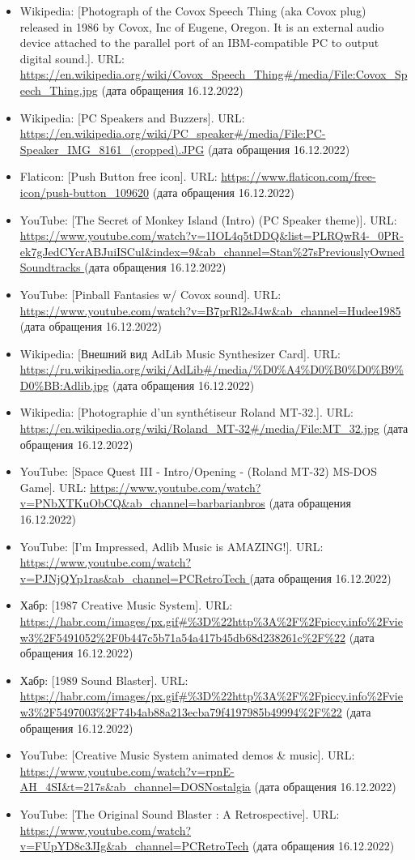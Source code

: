 \documentclass[a4paper,12pt]{extarticle}
\begin{document}
\begin{enumerate}[label=\textbf{\arabic*}]
\begin{itemize}
			\item Wikipedia: [Photograph of the Covox Speech Thing (aka Covox plug) released in 1986 by Covox, Inc of Eugene, Oregon. It is an external audio device attached to the parallel port of an IBM-compatible PC to output digital sound.]. URL: \url{https://en.wikipedia.org/wiki/Covox_Speech_Thing#/media/File:Covox_Speech_Thing.jpg} (дата обращения 16.12.2022)
			\item Wikipedia: [PC Speakers and Buzzers]. URL: \url{https://en.wikipedia.org/wiki/PC_speaker#/media/File:PC-Speaker_IMG_8161_(cropped).JPG} (дата обращения 16.12.2022)
			\item Flaticon: [Push Button free icon]. URL: \url{https://www.flaticon.com/free-icon/push-button_109620} (дата обращения 16.12.2022)
			\item YouTube: [The Secret of Monkey Island (Intro) (PC Speaker theme)]. URL: \url{https://www.youtube.com/watch?v=1IOL4q5tDDQ&list=PLRQwR4-_0PR-ek7gJedCYcrABJuiISCul&index=9&ab_channel=Stan%
			} (дата обращения 16.12.2022)
			\item YouTube: [Pinball Fantasies w/ Covox sound]. URL: \url{https://www.youtube.com/watch?v=B7prRl2sJ4w&ab_channel=Hudee1985
			} (дата обращения 16.12.2022)
			
			\item Wikipedia: [Внешний вид AdLib Music Synthesizer Card]. URL: \url{https://ru.wikipedia.org/wiki/AdLib#/media/%D0%A4%D0%B0%D0%B9%D0%BB:Adlib.jpg} (дата обращения 16.12.2022)
			\item Wikipedia: [Photographie d'un synthétiseur Roland MT-32.]. URL: \url{https://en.wikipedia.org/wiki/Roland_MT-32#/media/File:MT_32.jpg} (дата обращения 16.12.2022)
			\item YouTube: [Space Quest III - Intro/Opening - (Roland MT-32) MS-DOS Game]. URL: \url{https://www.youtube.com/watch?v=PNbXTKuObCQ&ab_channel=barbarianbros} (дата обращения 16.12.2022)
			\item YouTube: [I'm Impressed, Adlib Music is AMAZING!]. URL: \url{https://www.youtube.com/watch?v=PJNjQYp1ras&ab_channel=PCRetroTech
			} (дата обращения 16.12.2022)
			
			\item Хабр: [1987 Creative Music System]. URL: \url{https://habr.com/images/px.gif#%3D%22http%3A%2F%2Fpiccy.info%2Fview3%2F5491052%2F0b447c5b71a54a417b45db68d238261c%2F%22} (дата обращения 16.12.2022)
			\item Хабр: [1989 Sound Blaster]. URL: \url{https://habr.com/images/px.gif#%3D%22http%3A%2F%2Fpiccy.info%2Fview3%2F5497003%2F74b4ab88a213ecba79f4197985b49994%2F%22} (дата обращения 16.12.2022)
			\item YouTube: [Creative Music System animated demos \& music]. URL: \url{https://www.youtube.com/watch?v=rpnE-AH_4SI&t=217s&ab_channel=DOSNostalgia} (дата обращения 16.12.2022)
			\item YouTube: [The Original Sound Blaster : A Retrospective]. URL: \url{https://www.youtube.com/watch?v=FUpYD8c3JIg&ab_channel=PCRetroTech} (дата обращения 16.12.2022)
			

\end{itemize}
\end{enumerate}
\end{document}
